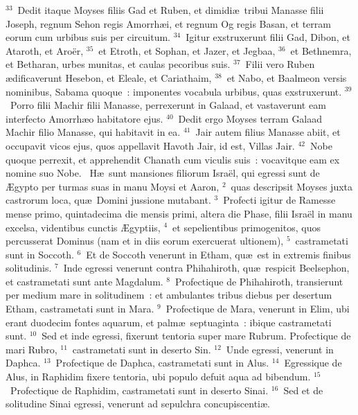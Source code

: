 ${}^{33}$~Dedit itaque Moyses filiis Gad et Ruben, et dimidi\ae\ tribui Manasse filii Joseph, regnum Sehon regis Amorrh\ae i, et regnum Og regis Basan, et terram eorum cum urbibus suis per circuitum.
${}^{34}$~Igitur exstruxerunt filii Gad, Dibon, et Ataroth, et Aro\"er,
${}^{35}$~et Etroth, et Sophan, et Jazer, et Jegbaa,
${}^{36}$~et Bethnemra, et Betharan, urbes munitas, et caulas pecoribus suis.
${}^{37}$~Filii vero Ruben \ae dificaverunt Hesebon, et Eleale, et Cariathaim,
${}^{38}$~et Nabo, et Baalmeon versis nominibus, Sabama quoque~: imponentes vocabula urbibus, quas exstruxerunt.
${}^{39}$~Porro filii Machir filii Manasse, perrexerunt in Galaad, et vastaverunt eam interfecto Amorrh\ae o habitatore ejus.
${}^{40}$~Dedit ergo Moyses terram Galaad Machir filio Manasse, qui habitavit in ea.
${}^{41}$~Jair autem filius Manasse abiit, et occupavit vicos ejus, quos appellavit Havoth Jair, id est, Villas Jair.
${}^{42}$~Nobe quoque perrexit, et apprehendit Chanath cum viculis suis~: vocavitque eam ex nomine suo Nobe.
~\lettrine[lines=10,image=true,loversize=0.05,lraise=-0.03]{H}{}\ae\ sunt mansiones filiorum Isra\"el, qui egressi sunt de \AE gypto per turmas suas in manu Moysi et Aaron,
${}^{2}$~quas descripsit Moyses juxta castrorum loca, qu\ae\ Domini jussione mutabant.
${}^{3}$~Profecti igitur de Ramesse mense primo, quintadecima die mensis primi, altera die Phase, filii Isra\"el in manu excelsa, videntibus cunctis \AE gyptiis,
${}^{4}$~et sepelientibus primogenitos, quos percusserat Dominus (nam et in diis eorum exercuerat ultionem),
${}^{5}$~castrametati sunt in Soccoth.
${}^{6}$~Et de Soccoth venerunt in Etham, qu\ae\ est in extremis finibus solitudinis.
${}^{7}$~Inde egressi venerunt contra Phihahiroth, qu\ae\ respicit Beelsephon, et castrametati sunt ante Magdalum.
${}^{8}$~Profectique de Phihahiroth, transierunt per medium mare in solitudinem~: et ambulantes tribus diebus per desertum Etham, castrametati sunt in Mara.
${}^{9}$~Profectique de Mara, venerunt in Elim, ubi erant duodecim fontes aquarum, et palm\ae\ septuaginta~: ibique castrametati sunt.
${}^{10}$~Sed et inde egressi, fixerunt tentoria super mare Rubrum. Profectique de mari Rubro,
${}^{11}$~castrametati sunt in deserto Sin.
${}^{12}$~Unde egressi, venerunt in Daphca.
${}^{13}$~Profectique de Daphca, castrametati sunt in Alus.
${}^{14}$~Egressique de Alus, in Raphidim fixere tentoria, ubi populo defuit aqua ad bibendum.
${}^{15}$~Profectique de Raphidim, castrametati sunt in deserto Sinai.
${}^{16}$~Sed et de solitudine Sinai egressi, venerunt ad sepulchra concupiscenti\ae .
